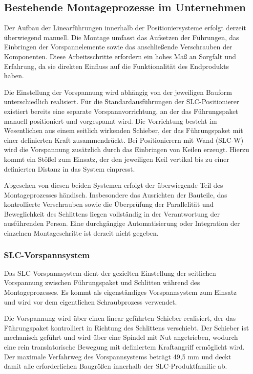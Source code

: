 \subsection{Bestehende Montageprozesse im Unternehmen}
Der Aufbau der Linearführungen innerhalb der Positioniersysteme erfolgt derzeit überwiegend manuell. Die Montage umfasst das Aufsetzen der Führungen, das Einbringen der Vorspannelemente sowie das anschließende Verschrauben der Komponenten. Diese Arbeitsschritte erfordern ein hohes Maß an Sorgfalt und Erfahrung, da sie direkten Einfluss auf die Funktionalität des Endprodukts haben.

Die Einstellung der Vorspannung wird abhängig von der jeweiligen Bauform unterschiedlich realisiert. Für die Standardausführungen der SLC-Positionierer existiert bereits eine separate Vorspannvorrichtung, an der das Führungspaket manuell positioniert und vorgespannt wird. Die Vorrichtung besteht im Wesentlichen aus einem seitlich wirkenden Schieber, der das Führungspaket mit einer definierten Kraft zusammendrückt. Bei Positionierern mit Wand (SLC-W) wird die Vorspannung zusätzlich durch das Einbringen von Keilen erzeugt. Hierzu kommt ein Stößel zum Einsatz, der den jeweiligen Keil vertikal bis zu einer definierten Distanz in das System einpresst.

Abgesehen von diesen beiden Systemen erfolgt der überwiegende Teil des Montageprozesses händisch. Insbesondere das Ausrichten der Bauteile, das kontrollierte Verschrauben sowie die Überprüfung der Parallelität und Beweglichkeit des Schlittens liegen vollständig in der Verantwortung der ausführenden Person. Eine durchgängige Automatisierung oder Integration der einzelnen Montageschritte ist derzeit nicht gegeben.

\subsubsection{SLC-Vorspannsystem}
Das SLC-Vorspannsystem dient der gezielten Einstellung der seitlichen Vorspannung zwischen Führungspaket und Schlitten während des Montageprozesses. Es kommt als eigenständiges Vorspannsystem zum Einsatz und wird vor dem eigentlichen Schraubprozess verwendet.

Die Vorspannung wird über einen linear geführten Schieber realisiert, der das Führungspaket kontrolliert in Richtung des Schlittens verschiebt. Der Schieber ist mechanisch geführt und wird über eine Spindel mit Nut angetrieben, wodurch eine rein translatorische Bewegung mit definiertem Kraftangriff ermöglicht wird. Der maximale Verfahrweg des Vorspannsystems beträgt 49,5 mm und deckt damit alle erforderlichen Baugrößen innerhalb der SLC-Produktfamilie ab.

